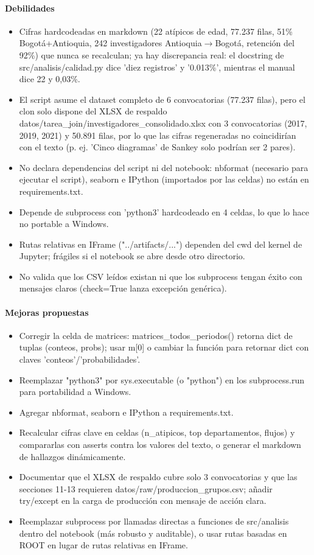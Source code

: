 \paragraph{Debilidades}
\begin{itemize}
  \item Cifras hardcodeadas en markdown (22 atípicos de edad, 77.237 filas, 51\% Bogotá+Antioquia, 242 investigadores Antioquia$\rightarrow$Bogotá, retención del 92\%) que nunca se recalculan; ya hay discrepancia real: el docstring de src/analisis/calidad.py dice 'diez registros' y '0.013\%', mientras el manual dice 22 y 0,03\%.
  \item El script asume el dataset completo de 6 convocatorias (77.237 filas), pero el clon solo dispone del XLSX de respaldo datos/tarea\_join/investigadores\_consolidado.xlsx con 3 convocatorias (2017, 2019, 2021) y 50.891 filas, por lo que las cifras regeneradas no coincidirían con el texto (p. ej. 'Cinco diagramas' de Sankey solo podrían ser 2 pares).
  \item No declara dependencias del script ni del notebook: nbformat (necesario para ejecutar el script), seaborn e IPython (importados por las celdas) no están en requirements.txt.
  \item Depende de subprocess con 'python3' hardcodeado en 4 celdas, lo que lo hace no portable a Windows.
  \item Rutas relativas en IFrame ("../artifacts/...") dependen del cwd del kernel de Jupyter; frágiles si el notebook se abre desde otro directorio.
  \item No valida que los CSV leídos existan ni que los subprocess tengan éxito con mensajes claros (check=True lanza excepción genérica).
\end{itemize}

\paragraph{Mejoras propuestas}
\begin{itemize}
  \item Corregir la celda de matrices: matrices\_todos\_periodos() retorna dict de tuplas (conteos, probs); usar m[0] o cambiar la función para retornar dict con claves 'conteos'/'probabilidades'.
  \item Reemplazar "python3" por sys.executable (o "python") en los subprocess.run para portabilidad a Windows.
  \item Agregar nbformat, seaborn e IPython a requirements.txt.
  \item Recalcular cifras clave en celdas (n\_atipicos, top departamentos, flujos) y compararlas con asserts contra los valores del texto, o generar el markdown de hallazgos dinámicamente.
  \item Documentar que el XLSX de respaldo cubre solo 3 convocatorias y que las secciones 11-13 requieren datos/raw/produccion\_grupos.csv; añadir try/except en la carga de producción con mensaje de acción clara.
  \item Reemplazar subprocess por llamadas directas a funciones de src/analisis dentro del notebook (más robusto y auditable), o usar rutas basadas en ROOT en lugar de rutas relativas en IFrame.
\end{itemize}

